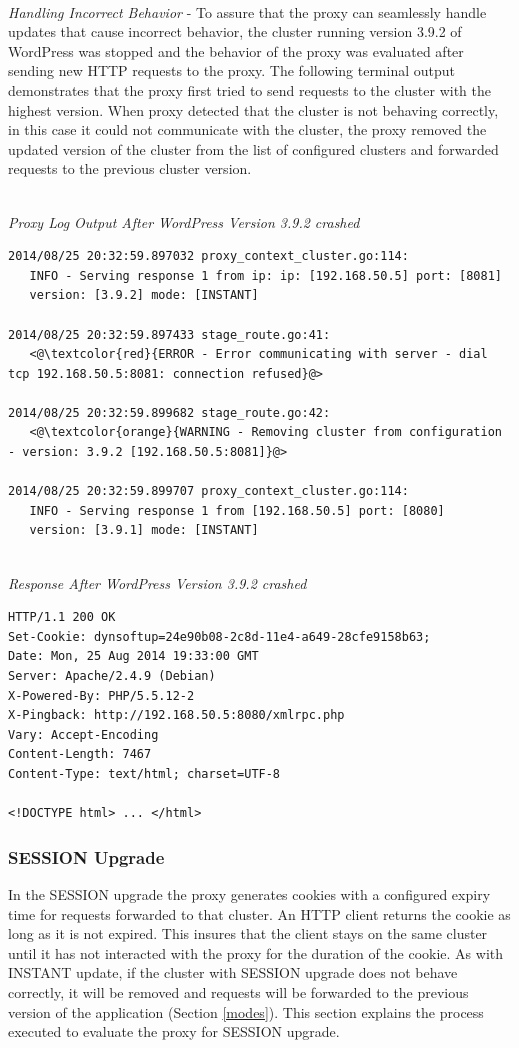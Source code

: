 \documentclass[a4paper,11pt,twoside]{report}
\begin{document}
\noindent\\
\textit{Handling Incorrect Behavior} - To assure that the proxy can seamlessly handle updates that cause incorrect behavior, the cluster running version 3.9.2 of WordPress was stopped and the behavior of the proxy was evaluated after sending new HTTP requests to the proxy. The following terminal output demonstrates that the proxy first tried to send requests to the cluster with the highest version. When proxy detected that the cluster is not behaving correctly, in this case it could not communicate with the cluster, the proxy removed the updated version of the cluster from the list of configured clusters and forwarded requests to the previous cluster version. 

\noindent\\
\textit{Proxy Log Output After WordPress Version 3.9.2 crashed}
\begin{lstlisting}[language=terminal]
2014/08/25 20:32:59.897032 proxy_context_cluster.go:114:     
   INFO - Serving response 1 from ip: ip: [192.168.50.5] port: [8081] 
   version: [3.9.2] mode: [INSTANT]
   
2014/08/25 20:32:59.897433 stage_route.go:41:    
   <@\textcolor{red}{ERROR - Error communicating with server - dial tcp 192.168.50.5:8081: connection refused}@>

2014/08/25 20:32:59.899682 stage_route.go:42:  
   <@\textcolor{orange}{WARNING - Removing cluster from configuration - version: 3.9.2 [192.168.50.5:8081]}@>

2014/08/25 20:32:59.899707 proxy_context_cluster.go:114:     
   INFO - Serving response 1 from [192.168.50.5] port: [8080] 
   version: [3.9.1] mode: [INSTANT]
\end{lstlisting}

\noindent\\
\textit{Response After WordPress Version 3.9.2 crashed}
\begin{lstlisting}[language=terminal]
HTTP/1.1 200 OK
Set-Cookie: dynsoftup=24e90b08-2c8d-11e4-a649-28cfe9158b63;
Date: Mon, 25 Aug 2014 19:33:00 GMT
Server: Apache/2.4.9 (Debian)
X-Powered-By: PHP/5.5.12-2
X-Pingback: http://192.168.50.5:8080/xmlrpc.php
Vary: Accept-Encoding
Content-Length: 7467
Content-Type: text/html; charset=UTF-8

<!DOCTYPE html> ... </html>  
\end{lstlisting}
   
\subsubsection*{SESSION Upgrade}
In the SESSION upgrade the proxy generates cookies with a configured expiry time for requests forwarded to that cluster. An HTTP client returns the cookie as long as it is not expired. This insures that the client stays on the same cluster until it has not interacted with the proxy for the duration of the cookie. As with INSTANT update, if the cluster with SESSION upgrade does not behave correctly, it will be removed and requests will be forwarded to the previous version of the application (Section \ref{modes}). This section explains the process executed to evaluate the proxy for SESSION upgrade.\medskip
\end{document}

